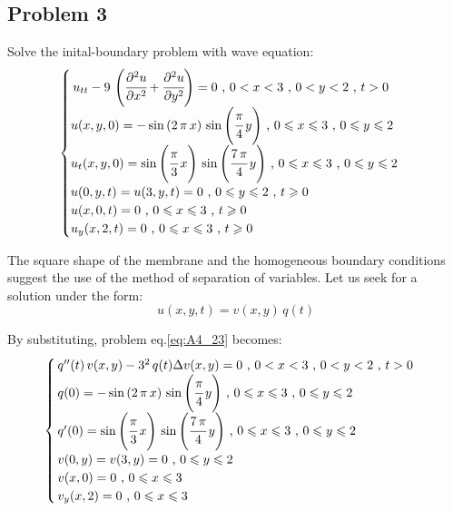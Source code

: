 \documentclass[../main.tex]{subfiles}
\begin{document}
\subsection{Problem 3}

Solve the inital-boundary problem with wave equation:
\begin{align}
    \begin{cases} \label{eq:A4_23}
        \, u_{tt} - 9 \, \left(\cfrac{\partial^2 u}{\partial x^2} + \cfrac{\partial^2 u}{\partial y^2}\right) = 0 \text{ ,  } 0 < x < 3 \text{ ,  } 0 < y < 2 \text{ ,  } t > 0 \\
        u(x, y, 0) = - \sin{(2 \, \pi \, x)} \, \sin{\left(\cfrac{\pi}{4} \, y \right)} \text{ ,  } 0 \leqslant x \leqslant 3 \text{ ,  } 0 \leqslant y \leqslant 2 \\
        u_t(x, y, 0) = \sin{\left(\cfrac{\pi}{3} \, x \right)} \, \sin{\left(\cfrac{7 \, \pi}{4} \, y \right)} \text{ ,  } 0 \leqslant x \leqslant 3 \text{ ,  } 0 \leqslant y \leqslant 2 \\
        u(0, y, t) = u(3, y, t) = 0 \text{ ,  } 0 \leqslant y \leqslant 2 \text{ ,  } t \geqslant 0 \\
        u(x, 0, t) = 0 \text{ ,  } 0 \leqslant x \leqslant 3 \text{ ,  } t \geqslant 0 \\
        u_y(x, 2, t) = 0 \text{ ,  } 0 \leqslant x \leqslant 3 \text{ ,  } t \geqslant 0
    \end{cases}
\end{align}

The square shape of the membrane and the homogeneous boundary conditions suggest the use of the method of separation of variables. Let us seek for a solution under the form:
\begin{equation} \label{eq:A4_24}
    u(x, y, t) = v(x, y) \, q(t)
\end{equation}

By substituting, problem eq.\ref{eq:A4_23} becomes:
\begin{align}
    \begin{cases} \label{eq:A4_25}
        \, q''(t) \, v(x, y) - 3^2 \, q(t) \Delta v(x, y) = 0 \text{ ,  } 0 < x < 3 \text{ ,  } 0 < y < 2 \text{ ,  } t > 0 \\
        \, q(0) = - \sin{(2 \, \pi \, x)} \, \sin{\left(\cfrac{\pi}{4} \, y \right)} \text{ ,  } 0 \leqslant x \leqslant 3 \text{ ,  } 0 \leqslant y \leqslant 2 \\
        \, q'(0) = \sin{\left(\cfrac{\pi}{3} \, x \right)} \, \sin{\left(\cfrac{7 \, \pi}{4} \, y \right)} \text{ ,  } 0 \leqslant x \leqslant 3 \text{ ,  } 0 \leqslant y \leqslant 2 \\
        \, v(0, y) = v(3, y) = 0 \text{ ,  } 0 \leqslant y \leqslant 2 \\
        \, v(x, 0) = 0 \text{ ,  } 0 \leqslant x \leqslant 3 \\
        \, v_y(x, 2) = 0 \text{ ,  } 0 \leqslant x \leqslant 3
    \end{cases}
\end{align}
\end{document}

